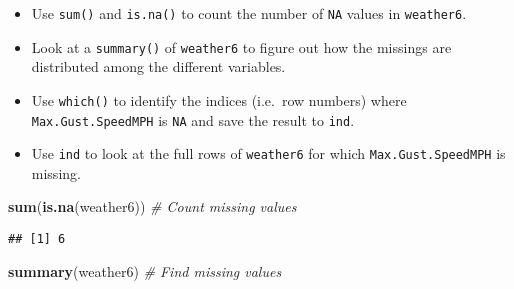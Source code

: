 \documentclass[]{article}
\newenvironment{Shaded}{\begin{snugshade}}{\end{snugshade}}
\newcommand{\KeywordTok}[1]{\textcolor[rgb]{0.13,0.29,0.53}{\textbf{#1}}}
\newcommand{\CommentTok}[1]{\textcolor[rgb]{0.56,0.35,0.01}{\textit{#1}}}
\newcommand{\NormalTok}[1]{#1}
\begin{document}
\begin{itemize}
\item
  Use \texttt{sum()} and \texttt{is.na()} to count the number of
  \texttt{NA} values in \texttt{weather6}.
\item
  Look at a \texttt{summary()} of \texttt{weather6} to figure out how
  the missings are distributed among the different variables.
\item
  Use \texttt{which()} to identify the indices (i.e.~row numbers) where
  \texttt{Max.Gust.SpeedMPH} is \texttt{NA} and save the result to
  \texttt{ind}.
\item
  Use \texttt{ind} to look at the full rows of \texttt{weather6} for
  which \texttt{Max.Gust.SpeedMPH} is missing.
\end{itemize}

\begin{Shaded}
\begin{Highlighting}[]
\KeywordTok{sum}\NormalTok{(}\KeywordTok{is.na}\NormalTok{(weather6)) }\CommentTok{# Count missing values}
\end{Highlighting}
\end{Shaded}

\begin{verbatim}
## [1] 6
\end{verbatim}

\begin{Shaded}
\begin{Highlighting}[]
\KeywordTok{summary}\NormalTok{(weather6) }\CommentTok{# Find missing values}
\end{Highlighting}
\end{Shaded}
\end{document}
